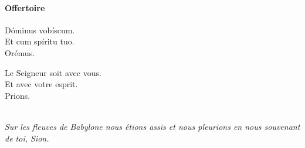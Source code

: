 \documentclass[twoside]{article}
\begin{document}
\paragraph{Offertoire}

\begin{paracol}{2}
\vv Dóminus vobíscum.\\
\rr Et cum spíritu tuo.\\
\vv Orémus.

\switchcolumn

\vv Le Seigneur soit avec vous.\\
\rr Et avec votre esprit.\\
\vv Prions.
\end{paracol}


\newpage
{}\\
\emph{Sur les fleuves de Babylone nous étions assis et nous pleurions en nous souvenant de toi, Sion.\\
\vv {} \\
\vv {} \\
\vv {} \\
\vv {} 
}
\end{document}
